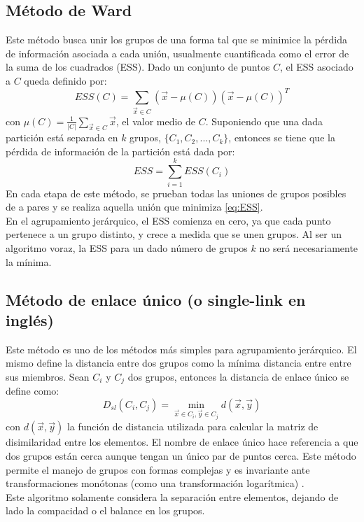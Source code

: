 \subsection{Método de Ward}
Este método busca unir los grupos de una forma tal que se minimice la pérdida de información asociada a cada unión, usualmente cuantificada como el error de la suma de los cuadrados (ESS). Dado un conjunto de puntos $C$, el ESS asociado a $C$ queda definido por:
\begin{equation}
	ESS(C) = \sum\limits_{\vec{x} \in C}(\vec{x}-\mu (C))(\vec{x}-\mu (C))^T
\end{equation}
con $\mu (C) = \frac{1}{|C|}\sum\limits_{\vec{x} \in C}\vec{x}$, el valor medio de $C$. Suponiendo que una dada partición está separada en $k$ grupos, $\{C_1, C_2,...,C_k\}$, entonces se tiene que la pérdida de información de la partición está dada por:
\begin{equation}
	ESS = \sum\limits_{i=1}^k ESS(C_i)
	\label{eq:ESS}
\end{equation}
En cada etapa de este método, se prueban todas las uniones de grupos posibles de a pares y se realiza aquella unión que minimiza \ref{eq:ESS}.\\
En el agrupamiento jerárquico, el ESS comienza en cero, ya que cada punto pertenece a un grupo distinto, y crece a medida que se unen grupos. Al ser un algoritmo voraz, la ESS para un dado número de grupos $k$ no será necesariamente la mínima.
\subsection{Método de enlace único (o single-link en inglés)}
Este método es uno de los métodos más simples para agrupamiento jerárquico. El mismo define la distancia entre dos grupos como la mínima distancia entre entre sus miembros. Sean $C_i$ y $C_j$ dos grupos, entonces la distancia de enlace único se define como:
\begin{equation}
	D_{sl}(C_i, C_j) = \min\limits_{\vec{x} \in C_i, \vec{y} \in C_j} d(\vec{x}, \vec{y})
\end{equation}
con $d(\vec{x}, \vec{y})$ la función de distancia utilizada para calcular la matriz de disimilaridad entre los elementos.
El nombre de enlace único hace referencia a que dos grupos están cerca aunque tengan un único par de puntos cerca. Este método permite el manejo de grupos con formas complejas y es invariante ante transformaciones monótonas (como una transformación logarítmica) \cite{Johnson1967}.\\
Este algoritmo solamente considera la separación entre elementos, dejando de lado la compacidad o el balance en los grupos.

